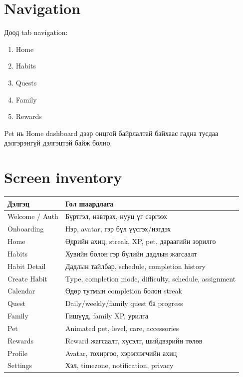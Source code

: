 \documentclass[12pt,a4paper,oneside]{report}
\begin{document}
\section{Navigation}
Доод tab navigation:
\begin{enumerate}
  \item Home
  \item Habits
  \item Quests
  \item Family
  \item Rewards
\end{enumerate}
Pet нь Home dashboard дээр онцгой байрлалтай байхаас гадна тусдаа дэлгэрэнгүй дэлгэцтэй байж болно.

\section{Screen inventory}
\begin{longtable}{p{}p{}}
\toprule
\textbf{Дэлгэц} & \textbf{Гол шаардлага}\\
\midrule
Welcome / Auth & Бүртгэл, нэвтрэх, нууц үг сэргээх\\
Onboarding & Нэр, avatar, гэр бүл үүсгэх/нэгдэх\\
Home & Өдрийн ахиц, streak, XP, pet, дараагийн зорилго\\
Habits & Хувийн болон гэр бүлийн дадлын жагсаалт\\
Habit Detail & Дадлын тайлбар, schedule, completion history\\
Create Habit & Type, completion mode, difficulty, schedule, assignment\\
Calendar & Өдөр тутмын completion болон streak\\
Quest & Daily/weekly/family quest ба progress\\
Family & Гишүүд, family XP, урилга\\
Pet & Animated pet, level, care, accessories\\
Rewards & Reward жагсаалт, хүсэлт, шийдвэрийн төлөв\\
Profile & Avatar, тохиргоо, хэрэглэгчийн ахиц\\
Settings & Хэл, timezone, notification, privacy\\
\bottomrule
\end{longtable}
\end{document}
